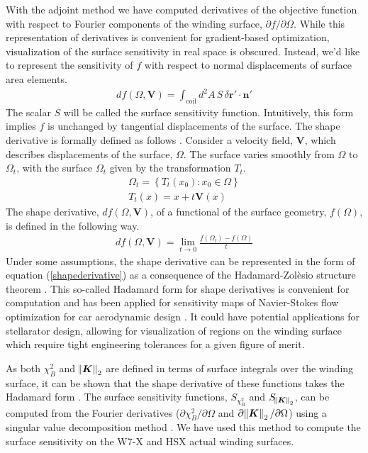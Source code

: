 \documentclass[aps,unsortedaddress]{revtex4-1}
\begin{document}
With the adjoint method we have computed derivatives of the objective function with respect to Fourier components of the winding surface, $\partial f/\partial \Omega$. While this representation of derivatives is convenient for gradient-based optimization, visualization of the surface sensitivity in real space is obscured. Instead, we'd like to represent the sensitivity of $f$ with respect to normal displacements of surface area elements. 
\begin{gather}
d f(\Omega,\bm{V}) = \int_{\text{coil}} d^2 A \, S \, \delta \bm{r}' \cdot \bm{n}' 
\label{shapederivative}
\end{gather}
The scalar $S$ will be called the surface sensitivity function. Intuitively, this form implies $f$ is unchanged by tangential displacements of the surface. The shape derivative is formally defined as follows \cite{Delfour2011}. Consider a velocity field, $\bm{V}$, which describes displacements of the surface, $\Omega$. The surface varies smoothly from $\Omega$ to $\Omega_t$, with the surface $\Omega_t$ given by the transformation $T_t$.
\begin{gather}
\Omega_t = \left \{ T_t(x_0) : x_0 \in \Omega \right \} \\
T_t(x) = x + t \bm{V}(x)
\end{gather}
The shape derivative, $df(\Omega,\bm{V})$, of a functional of the surface geometry, $f(\Omega)$, is defined in the following way. 
\begin{gather}
d f(\Omega, \bm{V}) = \lim_{t \rightarrow 0} \frac{ f(\Omega_t) - f(\Omega)}{t}
\end{gather}
Under some assumptions, the shape derivative can be represented in the form of equation (\ref{shapederivative}) as a consequence of the Hadamard-Zol\`{e}sio structure theorem \cite{Delfour2011}. This so-called Hadamard form for shape derivatives is convenient for computation and has been applied for sensitivity maps of Navier-Stokes flow optimization for car aerodynamic design \cite{Othmer2008,Othmer2014}. It could have potential applications for stellarator design, allowing for visualization of regions on the winding surface which require tight engineering tolerances for a given figure of merit. 

As both $\chi^2_B$ and $\norm{\bm{K}}_2$ are defined in terms of surface integrals over the winding surface, it can be shown that the shape derivative of these functions takes the Hadamard form \cite{Novotny2013}. The surface sensitivity functions, $S_{\chi^2_B}$ and $S_{\norm{\bm{K}}_2}$, can be computed from the Fourier derivatives ($\partial \chi^2_B/\partial \Omega$ and $\partial \norm{\bm{K}}_2/\partial \Omega$) using a singular value decomposition method \cite{Landreman2018}. We have used this method to compute the surface sensitivity on the W7-X and HSX actual winding surfaces.  
\end{document}
